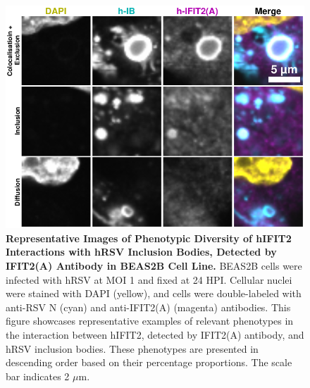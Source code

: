 \begin{figure}
    \centering
    \includegraphics[width=1\linewidth]{08. Chapter 3/Figs/02. Infection/02. IFIT2/01. IFIT2A/12. i2a beas2b.pdf} 
    \caption[Representative Images of Phenotypic Diversity of hIFIT2 Interactions with hRSV Inclusion Bodies, Detected by IFIT2(A) Antibody in BEAS2B Cell Line.]{\textbf{Representative Images of Phenotypic Diversity of hIFIT2 Interactions with hRSV Inclusion Bodies, Detected by IFIT2(A) Antibody in BEAS2B Cell Line.} BEAS2B cells were infected with hRSV at MOI 1 and fixed at 24 HPI. Cellular nuclei were stained with DAPI (yellow), and cells were double-labeled with anti-RSV N (cyan) and anti-IFIT2(A) (magenta) antibodies. This figure showcases representative examples of relevant phenotypes in the interaction between hIFIT2, detected by IFIT2(A) antibody, and hRSV inclusion bodies. These phenotypes are presented in descending order based on their percentage proportions. The scale bar indicates 2 \(\mu \mbox{m}\).}
    \label{fig:Representative Images of Phenotypic Diversity of hIFIT2 Interactions with hRSV Inclusion Bodies, Detected by IFIT2(A) Antibody in BEAS2B Cell Line}
\end{figure}

